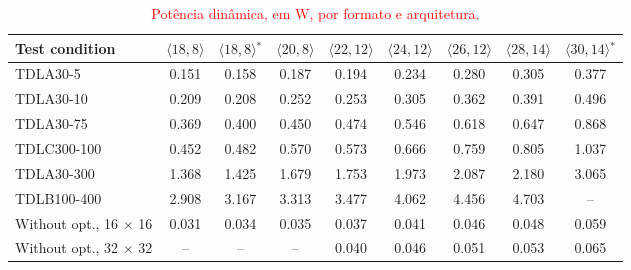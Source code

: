 \begin{table}[htbp]
\caption{\textcolor{red}{Potência dinâmica, em W, por formato e arquitetura.}}
\label{tab:potencia-dinamica}
\vspace{4pt} %
\centering
\footnotesize
\color{red}
\renewcommand{\arraystretch}{1.2}
\setlength{\tabcolsep}{3pt}
\begin{tabular}{lcccccccc}
\toprule
\textbf{Test condition} & \textbf{$\langle 18,8\rangle$} & \textbf{$\langle 18,8\rangle$$^{*}$} & \textbf{$\langle 20,8\rangle$} & \textbf{$\langle 22,12\rangle$} & \textbf{$\langle 24,12\rangle$} & \textbf{$\langle 26,12\rangle$} & \textbf{$\langle 28,14\rangle$} & \textbf{$\langle 30,14\rangle$$^{*}$} \\
\midrule
TDLA30-5 & 0.151 & 0.158 & 0.187 & 0.194 & 0.234 & 0.280 & 0.305 & 0.377 \\
TDLA30-10 & 0.209 & 0.208 & 0.252 & 0.253 & 0.305 & 0.362 & 0.391 & 0.496 \\
TDLA30-75 & 0.369 & 0.400 & 0.450 & 0.474 & 0.546 & 0.618 & 0.647 & 0.868 \\
TDLC300-100 & 0.452 & 0.482 & 0.570 & 0.573 & 0.666 & 0.759 & 0.805 & 1.037 \\
TDLA30-300 & 1.368 & 1.425 & 1.679 & 1.753 & 1.973 & 2.087 & 2.180 & 3.065 \\
TDLB100-400 & 2.908 & 3.167 & 3.313 & 3.477 & 4.062 & 4.456 & 4.703 & -- \\
\midrule
Without opt., 16 $\times$ 16 & 0.031 & 0.034 & 0.035 & 0.037 & 0.041 & 0.046 & 0.048 & 0.059 \\
Without opt., 32 $\times$ 32 & -- & -- & -- & 0.040 & 0.046 & 0.051 & 0.053 & 0.065 \\
\bottomrule
\end{tabular}
\vspace{4pt}
\end{table}
